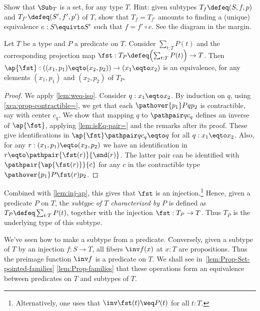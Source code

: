 \begin{xca}\label{xca:subtypes-set}
Show that $\Sub_T$ is a set, for any type $T$. Hint:
given subtypes $T_f\defeq(S,f,p)$ and $T_{f'}\defeq(S',f',p')$ of $T$,
show that $T_f=T_{f'}$ amounts to finding a (unique) equivalence%
\marginnote{%
    \[
      \begin{tikzcd}[ampersand replacement=\&]
        S \ar[rr,"{e}","{\sim}"']\ar[dr,"{f}"'] \& \& S'\ar[dl,"{f'}"] \\
        \& T \&
      \end{tikzcd}
    \]}
$e: S\equivto S'$ such that $f = f'\circ e$. See the diagram in the margin.
\end{xca}

\begin{lemma}\label{lem:subtype-eq-=}
  Let $T$ be a type and $P$ a predicate on $T$.
  Consider $\sum_{t:T}P(t)$ and the corresponding projection map
  $\fst : T_P \defeq \Bigl(\sum_{t:T}P(t)\Bigr) \to T$.
  Then $\ap{\fst}: ((x_1,p_1) \eqto (x_2,p_2)) \to (x_1 \eqto x_2)$ is an equivalence,
  for any elements $(x_1,p_1)$ and $(x_2,p_2)$ of $T_P$.
\end{lemma}

\begin{proof}
We apply \cref{lem:weq-iso}. Consider $q: x_1 \eqto x_2$.
By induction on $q$, using \cref{xca:prop-contractible=},
we get that each $\pathover {p_1} P q {p_2}$ is contractible,
say with center $c_q$. We show that
mapping $q$ to $\pathpair q {c_q}$ defines an inverse of $\ap{\fst}$,
applying \cref{lem:isEq-pair=} and the remarks after its proof.
These give identifications in $\ap{\fst}\pathpair q {c_q} \eqto q$
for all $q: x_1 \eqto x_2$.
Also, for any $r: (x_1,p_1) \eqto (x_2,p_2)$ we have an identification
in $r \eqto \pathpair{\fst(r)}{\snd(r)}$.
The latter pair can be identified with
$\pathpair{\ap{\fst(r)}}{c}$ for any $c$
in the contractible type $\pathover {p_1} P {\fst(r)} {p_2}$.
\end{proof}

Combined with \cref{lem:inj-ap},
this gives that $\fst$ is an injection.\footnote{%
Alternatively, one uses that $\inv\fst(t)\weq P(t)$ for all $t:T$.}
Hence, given a predicate $P$ on $T$,
the \emph{subtype of $T$ characterized by $P$} is defined
as $T_P\defeq \sum_{t:T} P(t)$,
together with the injection $\fst : T_P \to T$.
Thus $T_P$ is the underlying type of this subtype.

We've seen how to make a subtype from a predicate.
Conversely, given a subtype of $T$ by an injection
$f : S \to T$, all fibers $\inv f(x)$ at $x:T$ are propositions. 
Thus the preimage function $\inv f$ is a predicate on $T$.
We shall see in~\cref{lem:Prop-Set-pointed-families}
\ref{lem:Prop-families} that these operations form an equivalence
between predicates on $T$ and subtypes of $T$.

